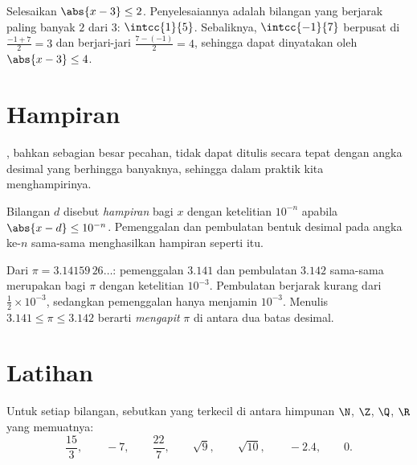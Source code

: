 \begin{example}\label{ex:g10:numbers:abs}
Selesaikan $\abs{x - 3} \leq 2$. Penyelesaiannya adalah bilangan yang berjarak
paling banyak $2$ dari $3$:  $\intcc{1}{5}$. Sebaliknya, 
$\intcc{-1}{7}$ berpusat di $\frac{-1+7}{2} = 3$ dan berjari-jari
$\frac{7-(-1)}{2} = 4$, sehingga dapat dinyatakan oleh $\abs{x - 3} \leq 4$.
\end{example}

\section{Hampiran}

, bahkan sebagian besar pecahan, tidak dapat ditulis secara
tepat dengan angka desimal yang berhingga banyaknya, sehingga dalam praktik
kita menghampirinya.

\begin{definition}\label{def:g10:numbers:approx}
Bilangan $d$ disebut \emph{hampiran} bagi $x$ dengan
ketelitian $10^{-n}$ apabila $\abs{x - d} \leq 10^{-n}$. Pemenggalan dan
pembulatan bentuk desimal pada angka ke-$n$ sama-sama menghasilkan
hampiran seperti itu.
\end{definition}

\begin{example}
Dari $\pi = 3.14159\,26\dots$: pemenggalan $3.141$ dan pembulatan $3.142$
sama-sama merupakan  bagi $\pi$ dengan ketelitian $10^{-3}$.
Pembulatan berjarak kurang dari $\frac12 \times 10^{-3}$, sedangkan
pemenggalan hanya menjamin $10^{-3}$. Menulis $3.141 \leq \pi \leq 3.142$
berarti \emph{mengapit} $\pi$ di antara dua batas desimal.
\end{example}

\section{Latihan}

\begin{exercise}[$\star$]\label{exo:g10:numbers:1}
Untuk setiap bilangan, sebutkan yang terkecil di antara himpunan $\N$, $\Z$,
$\Q$, $\R$ yang memuatnya:
\[
\frac{15}{3}, \qquad -7, \qquad \frac{22}{7}, \qquad \sqrt{9}, \qquad
\sqrt{10}, \qquad -2.4, \qquad 0 .
\]
\end{exercise}

